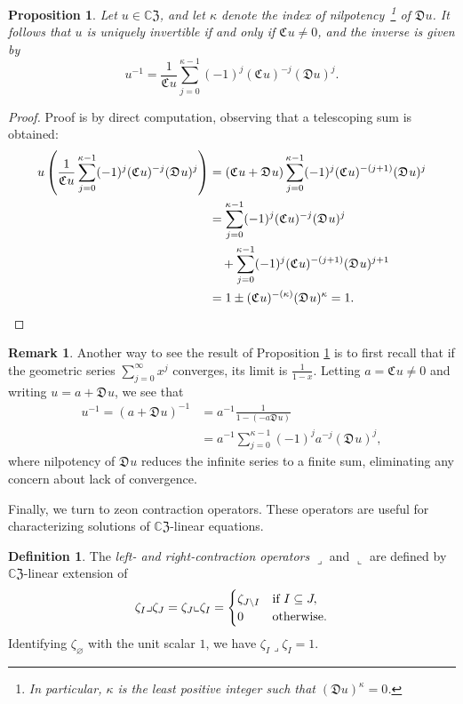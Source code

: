 \documentclass{article}
\newtheorem{proposition}[theorem]{Proposition}
\theoremstyle{definition}
\newtheorem{definition}[theorem]{Definition}
\newtheorem{remark}[theorem]{Remark}
\newcommand{\zco}{\mathfrak{C}\mspace{1mu}}
\newcommand{\zdu}{\mathfrak{D}\mspace{1mu}}
\newcommand{\CZ}{\mathbb{C}\mathfrak{Z}}
\numberwithin{equation}{section}
\begin{document}
\begin{proposition}\label{zeon inverses}
Let $u\in\CZ$, and let $\kappa$ denote the index of nilpotency~\footnote{In particular, $\kappa$ is the least positive integer such that $(\mathfrak{D}u)^\kappa=0$.} of $\mathfrak{D}u$.    It follows that $u$ is uniquely invertible if and only if $\zco u\ne0$, and the inverse  is given by \begin{equation}\label{inv def}
u^{-1}=\frac{1}{\zco u}\sum_{j=0}^{\kappa-1}(-1)^{j}(\zco u)^{-j}(\mathfrak{D}u)^{j}.
\end{equation}
\end{proposition}

\begin{proof}
Proof is by direct computation, observing that a telescoping sum is obtained:
\begin{align*}
u\left(\frac{1}{\zco u}\sum_{j=0}^{\kappa-1}(-1)^{j}(\zco u)^{-j}(\zdu u)^j\right)&=
(\zco u+\zdu u)\sum_{j=0}^{\kappa-1}(-1)^{j}({\zco u})^{-(j+1)}(\zdu u)^j\\
&=\sum_{j=0}^{\kappa-1}(-1)^{j}({\zco u})^{-j}(\zdu u)^j\\
&\hskip10pt+\sum_{j=0}^{\kappa-1}(-1)^{j}({\zco u})^{-(j+1)}(\zdu u)^{j+1}\\
&=1\pm ({\zco u})^{-(\kappa)}(\zdu u)^\kappa=1.
\end{align*}
\end{proof}

\begin{remark}
Another way to see the result of Proposition \ref{zeon inverses} is to first recall that if the geometric series $\sum_{j=0}^\infty x^j$ converges, its limit is $\frac{1}{1-x}$.  Letting $a=\zco u\ne 0$ and writing $u=a+\zdu u$, we see that \begin{align*}
u^{-1}=(a+\zdu u)^{-1}&=a^{-1}\frac{1}{1- (-a\zdu u)}\\
&=a^{-1}\sum_{j=0}^{\kappa-1}(-1)^{j}a^{-j}(\zdu u)^j,
\end{align*}
where nilpotency of $\zdu u$ reduces the infinite series to a finite sum, eliminating any concern about lack of convergence.  
\end{remark}

Finally, we turn to zeon contraction operators.  These operators are useful for characterizing solutions of $\CZ$-linear equations.  

\begin{definition}
The {\em left- and right-contraction operators} $\lrcorner$ and $\llcorner$ are defined  by $\CZ$-linear extension of \begin{equation}\label{contraction def}
\zeta_I\lrcorner \zeta_J=\zeta_J\llcorner\zeta_I=\begin{cases}
\zeta_{J\setminus I}&\text{\rm if }I\subseteq J,\\
0&\text{\rm otherwise.}
\end{cases}
\end{equation}
Identifying $\zeta_\varnothing$ with the unit scalar $1$, we have $\zeta_I\lrcorner\zeta_I=1$.
\end{definition}
\end{document}
